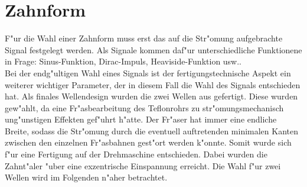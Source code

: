 \section{Zahnform}
F"ur die Wahl einer Zahnform muss erst das auf die Str"omung aufgebrachte Signal festgelegt werden. Als Signale kommen daf"ur unterschiedliche Funktionene in Frage: Sinus-Funktion, Dirac-Impuls, Heaviside-Funktion usw..\\
Bei der endg"ultigen Wahl eines Signals ist der fertigungstechnische Aspekt ein weiterer wichtiger Parameter, der in diesem Fall die Wahl des Signals entschieden hat. Als finales Wellendesign wurden die zwei Wellen aus  gefertigt. Diese wurden gew"ahlt, da eine Fr"asbearbeitung des Teflonrohrs zu str"omungsmechanisch ung"unstigen Effekten gef"uhrt h"atte. Der Fr"aser hat immer eine endliche Breite, sodass die Str"omung durch die eventuell auftretenden minimalen Kanten zwischen den einzelnen Fr"asbahnen gest"ort werden k"onnte. Somit wurde sich f"ur eine Fertigung auf der Drehmaschine entschieden. Dabei wurden die Zahnt"aler "uber eine exzentrische Einspannung erreicht. Die Wahl f"ur zwei Wellen wird im Folgenden n"aher betrachtet.
